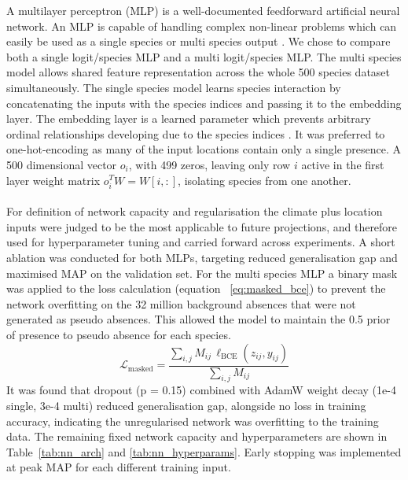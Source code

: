\documentclass{article}
\begin{document}
A multilayer perceptron (MLP) is a well-documented feedforward artificial neural network. An MLP is capable of handling  complex non-linear problems which can easily be used as a single species or multi species output \cite{https://doi.org/10.1111/2041-210X.14466}. We chose to compare both a single logit/species MLP and a multi logit/species MLP. The multi species model allows shared feature representation across the whole 500 species dataset simultaneously. The single species model learns species interaction by concatenating the inputs with the species indices and passing it to the embedding layer. The embedding layer is a learned parameter which prevents arbitrary ordinal relationships developing due to the species indices \cite{google_ml_embeddings}. It was preferred to one-hot-encoding as many of the input locations contain only a single presence. A 500 dimensional vector \(o_i\), with 499 zeros, leaving only row \(i\) active in the first layer weight matrix \(o_i^TW=W[i,:]\), isolating species from one another.
\\\\
For definition of network capacity and regularisation the climate plus location inputs were judged to be the most applicable to future projections, and therefore used for hyperparameter tuning and carried forward across experiments. A short ablation was conducted for both MLPs, targeting reduced generalisation gap and maximised MAP on the validation set. For the multi species MLP a binary mask was applied to the loss calculation (equation ~\ref{eq:masked_bce}) to prevent the network overfitting on the 32 million background absences that were not generated as pseudo absences. This allowed the model to maintain the 0.5 prior of presence to pseudo absence for each species.
\\\begin{equation}
    \mathcal{L}_{\text{masked}} = \frac{\sum_{i,j} M_{ij} \, \ell_{\text{BCE}}(z_{ij}, y_{ij})}{\sum_{i,j} M_{ij}}
    \label{eq:masked_bce}
\end{equation}
It was found that dropout (p = 0.15) combined with AdamW weight decay (1e-4 single, 3e-4 multi) reduced generalisation gap, alongside no loss in training accuracy, indicating the unregularised network was overfitting to the training data. The remaining fixed network capacity and hyperparameters are shown in Table~\ref{tab:nn_arch} and \ref{tab:nn_hyperparams}. Early stopping was implemented at peak MAP for each different training input.
\end{document}
